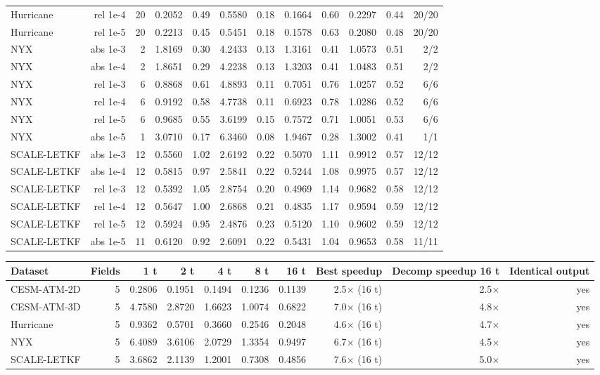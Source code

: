 \begin{tabular}{lrrrrrrrrrrr}
Hurricane & rel 1e-4 & 20 & 0.2052 & 0.49 & 0.5580 & 0.18 & 0.1664 & 0.60 & 0.2297 & 0.44 & 20/20 \\
Hurricane & rel 1e-5 & 20 & 0.2213 & 0.45 & 0.5451 & 0.18 & 0.1578 & 0.63 & 0.2080 & 0.48 & 20/20 \\
NYX & abs 1e-3 & 2 & 1.8169 & 0.30 & 4.2433 & 0.13 & 1.3161 & 0.41 & 1.0573 & 0.51 & 2/2 \\
NYX & abs 1e-4 & 2 & 1.8651 & 0.29 & 4.2238 & 0.13 & 1.3203 & 0.41 & 1.0483 & 0.51 & 2/2 \\
NYX & rel 1e-3 & 6 & 0.8868 & 0.61 & 4.8893 & 0.11 & 0.7051 & 0.76 & 1.0257 & 0.52 & 6/6 \\
NYX & rel 1e-4 & 6 & 0.9192 & 0.58 & 4.7738 & 0.11 & 0.6923 & 0.78 & 1.0286 & 0.52 & 6/6 \\
NYX & rel 1e-5 & 6 & 0.9685 & 0.55 & 3.6199 & 0.15 & 0.7572 & 0.71 & 1.0051 & 0.53 & 6/6 \\
NYX & abs 1e-5 & 1 & 3.0710 & 0.17 & 6.3460 & 0.08 & 1.9467 & 0.28 & 1.3002 & 0.41 & 1/1 \\
SCALE-LETKF & abs 1e-3 & 12 & 0.5560 & 1.02 & 2.6192 & 0.22 & 0.5070 & 1.11 & 0.9912 & 0.57 & 12/12 \\
SCALE-LETKF & abs 1e-4 & 12 & 0.5815 & 0.97 & 2.5841 & 0.22 & 0.5244 & 1.08 & 0.9975 & 0.57 & 12/12 \\
SCALE-LETKF & rel 1e-3 & 12 & 0.5392 & 1.05 & 2.8754 & 0.20 & 0.4969 & 1.14 & 0.9682 & 0.58 & 12/12 \\
SCALE-LETKF & rel 1e-4 & 12 & 0.5647 & 1.00 & 2.6868 & 0.21 & 0.4835 & 1.17 & 0.9594 & 0.59 & 12/12 \\
SCALE-LETKF & rel 1e-5 & 12 & 0.5924 & 0.95 & 2.4876 & 0.23 & 0.5120 & 1.10 & 0.9602 & 0.59 & 12/12 \\
SCALE-LETKF & abs 1e-5 & 11 & 0.6120 & 0.92 & 2.6091 & 0.22 & 0.5431 & 1.04 & 0.9653 & 0.58 & 11/11 \\
\bottomrule
\end{tabular}

\begin{tabular}{lrrrrrrrrr}
\toprule
\textbf{Dataset} & \textbf{Fields} & \textbf{1 t} & \textbf{2 t} & \textbf{4 t} & \textbf{8 t} & \textbf{16 t} & \textbf{Best speedup} & \textbf{Decomp speedup 16 t} & \textbf{Identical output} \\
\midrule
CESM-ATM-2D & 5 & 0.2806 & 0.1951 & 0.1494 & 0.1236 & 0.1139 & 2.5$\times$ (16 t) & 2.5$\times$ & yes \\
CESM-ATM-3D & 5 & 4.7580 & 2.8720 & 1.6623 & 1.0074 & 0.6822 & 7.0$\times$ (16 t) & 4.8$\times$ & yes \\
Hurricane & 5 & 0.9362 & 0.5701 & 0.3660 & 0.2546 & 0.2048 & 4.6$\times$ (16 t) & 4.7$\times$ & yes \\
NYX & 5 & 6.4089 & 3.6106 & 2.0729 & 1.3354 & 0.9497 & 6.7$\times$ (16 t) & 4.5$\times$ & yes \\
SCALE-LETKF & 5 & 3.6862 & 2.1139 & 1.2001 & 0.7308 & 0.4856 & 7.6$\times$ (16 t) & 5.0$\times$ & yes \\
\bottomrule
\end{tabular}

